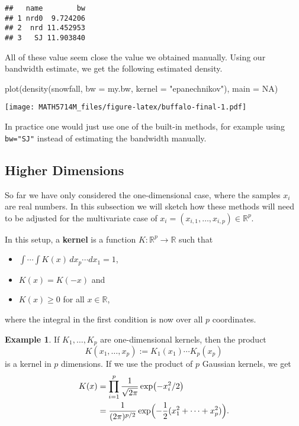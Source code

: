 \documentclass[
  a4paper,
]{article}
\newenvironment{Shaded}{\begin{snugshade}}{\end{snugshade}}
\newcommand{\AttributeTok}[1]{\textcolor[rgb]{0.77,0.63,0.00}{#1}}
\newcommand{\ConstantTok}[1]{\textcolor[rgb]{0.00,0.00,0.00}{#1}}
\newcommand{\FunctionTok}[1]{\textcolor[rgb]{0.00,0.00,0.00}{#1}}
\newcommand{\NormalTok}[1]{#1}
\newcommand{\StringTok}[1]{\textcolor[rgb]{0.31,0.60,0.02}{#1}}
\providecommand{\tightlist}{%
  \setlength{\itemsep}{0pt}\setlength{\parskip}{0pt}}
\theoremstyle{definition}
\theoremstyle{definition}
\newtheorem{example}{Example}[section]
\theoremstyle{definition}
\theoremstyle{definition}
\theoremstyle{remark}
\begin{document}
\begin{verbatim}
##   name        bw
## 1 nrd0  9.724206
## 2  nrd 11.452953
## 3   SJ 11.903840
\end{verbatim}

All of these value seem close the value we obtained manually. Using
our bandwidth estimate, we get the following estimated density.

\begin{Shaded}
\begin{Highlighting}[]
\FunctionTok{plot}\NormalTok{(}\FunctionTok{density}\NormalTok{(snowfall, }\AttributeTok{bw =}\NormalTok{ my.bw, }\AttributeTok{kernel =} \StringTok{"epanechnikov"}\NormalTok{),}
     \AttributeTok{main =} \ConstantTok{NA}\NormalTok{)}
\end{Highlighting}
\end{Shaded}

\texttt{[image: MATH5714M\_files/figure-latex/buffalo-final-1.pdf]}

In practice one would just use one of the built-in methods, for example using
\texttt{bw="SJ"} instead of estimating the bandwidth manually.

\hypertarget{higher-dimensions}{%
\subsection{Higher Dimensions}\label{higher-dimensions}}

So far we have only considered the one-dimensional case, where the samples \(x_i\)
are real numbers. In this subsection we will sketch how these methods will need
to be adjusted for the multivariate case of \(x_i = (x_{i,1}, \ldots, x_{i,p}) \in \mathbb{R}^p\).

In this setup, a \textbf{kernel} is a function \(K\colon \mathbb{R}^p\to \mathbb{R}\) such that

\begin{itemize}
\tightlist
\item
  \(\int \cdots \int K(x) \,dx_p \cdots dx_1 = 1\),
\item
  \(K(x) = K(-x)\) and
\item
  \(K(x) \geq 0\) for all \(x\in \mathbb{R}\),
\end{itemize}

where the integral in the first condition is now over all \(p\) coordinates.

\begin{example}
If \(K_1, \ldots, K_p\) are one-dimensional kernels, then the product
\begin{equation*}
  K(x_1, \ldots, x_p)
  := K_1(x_1) \cdots K_p(x_p)
\end{equation*}
is a kernel in \(p\) dimensions. If we use the product of \(p\)
Gaussian kernels, we get
\begin{align*}
  K(x)
  &= \prod_{i=1}^p \frac{1}{\sqrt{2\pi}} \exp\bigl(-x_i^2/2\bigr) \\
  &=  \frac{1}{(2\pi)^{p/2}} \exp\Bigl(-\frac12 (x_1^2 + \cdots + x_p^2) \Bigr).
\end{align*}
\end{example}
\end{document}
